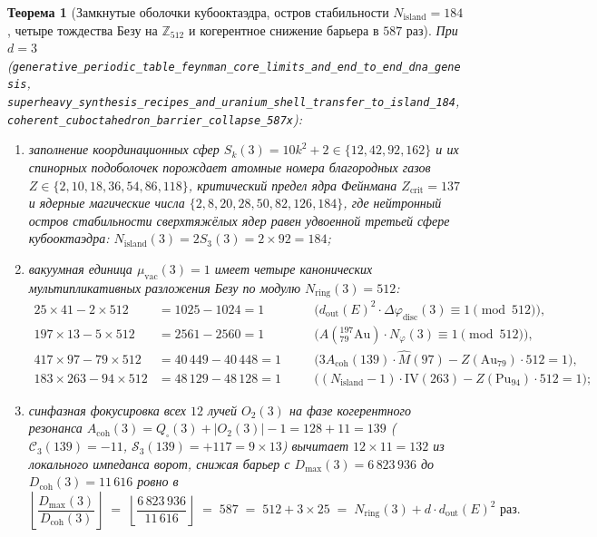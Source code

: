\documentclass[11pt,a4paper]{article}
\theoremstyle{plain}
\newtheorem{theorem}{Теорема}[section]
\theoremstyle{definition}
\begin{document}
\begin{theorem}[Замкнутые оболочки кубооктаэдра, остров стабильности $N_{\mathrm{island}}=184$, четыре тождества Безу на $\mathbb{Z}_{512}$ и когерентное снижение барьера в $587$ раз]
\label{thm:nuclear-587}
При $d=3$ (\texttt{generative\_periodic\_table\_feynman\_core\_limits\_and\_end\_to\_end\_dna\_genesis}, \texttt{superheavy\_synthesis\_recipes\_and\_uranium\_shell\_transfer\_to\_island\_184}, \texttt{coherent\_cuboctahedron\_barrier\_collapse\_587x}):
\begin{enumerate}[label=\textbf{(\roman*)},leftmargin=*]
\item заполнение координационных сфер $S_k(3) = 10k^2 + 2 \in \{12,42,92,162\}$ и их спинорных подоболочек порождает атомные номера благородных газов $Z\in\{2,10,18,36,54,86,118\}$, критический предел ядра Фейнмана $Z_{\mathrm{crit}} = 137$ и ядерные магические числа $\{2,8,20,28,50,82,126,184\}$, где нейтронный остров стабильности сверхтяжёлых ядер равен удвоенной третьей сфере кубооктаэдра: $N_{\mathrm{island}}(3) = 2S_3(3) = 2\times 92 = 184$;
\item вакуумная единица $\mu_{\mathrm{vac}}(3) = 1$ имеет четыре канонических мультипликативных разложения Безу по модулю $N_{\mathrm{ring}}(3) = 512$:
  \begin{equation}
    \label{eq:four-bezout-512}
    \begin{aligned}
      25\times 41 - 2\times 512 &= 1025 - 1024 = 1 &\quad &\bigl(d_{\mathrm{out}}(E)^2\cdot\Delta\varphi_{\mathrm{disc}}(3) \equiv 1\pmod{512}\bigr), \\
      197\times 13 - 5\times 512 &= 2561 - 2560 = 1 &\quad &\bigl(A(^{197}_{79}\mathrm{Au})\cdot N_\varphi(3) \equiv 1\pmod{512}\bigr), \\
      417\times 97 - 79\times 512 &= 40\,449 - 40\,448 = 1 &\quad &\bigl(3 A_{\mathrm{coh}}(139)\cdot\hat{M}(97) - Z(\mathrm{Au}_{79})\cdot 512 = 1\bigr), \\
      183\times 263 - 94\times 512 &= 48\,129 - 48\,128 = 1 &\quad &\bigl((N_{\mathrm{island}}-1)\cdot\mathrm{IV}(263) - Z(\mathrm{Pu}_{94})\cdot 512 = 1\bigr);
    \end{aligned}
  \end{equation}
\item синфазная фокусировка всех $12$ лучей $O_2(3)$ на фазе когерентного резонанса $A_{\mathrm{coh}}(3) = Q_\square(3) + |O_2(3)| - 1 = 128 + 11 = 139$ ($\mathcal{C}_3(139) = -11$, $\mathcal{S}_3(139) = +117 = 9\times 13$) вычитает $12\times 11 = 132$ из локального импеданса ворот, снижая барьер с $D_{\max}(3) = 6\,823\,936$ до $D_{\mathrm{coh}}(3) = 11\,616$ ровно в
  \begin{equation}
    \label{eq:collapse-587}
    \left\lfloor \frac{D_{\max}(3)}{D_{\mathrm{coh}}(3)}\right\rfloor \;=\; \left\lfloor \frac{6\,823\,936}{11\,616}\right\rfloor \;=\; 587 \;=\; 512 + 3\times 25 \;=\; N_{\mathrm{ring}}(3) + d\cdot d_{\mathrm{out}}(E)^2 \text{ раз.}
  \end{equation}
\end{enumerate}
\end{theorem}
\end{document}
